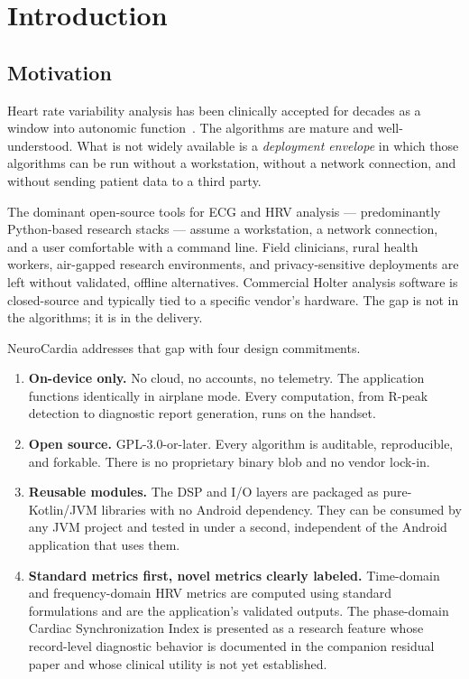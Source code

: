 \documentclass[11pt]{article}
\begin{document}
\tableofcontents

\section{Introduction}

\subsection{Motivation}

Heart rate variability analysis has been clinically accepted for
decades as a window into autonomic function~\cite{taskforce1996}. The
algorithms are mature and well-understood. What is not widely available
is a \emph{deployment envelope} in which those algorithms can be run
without a workstation, without a network connection, and without
sending patient data to a third party.

The dominant open-source tools for ECG and HRV analysis ---
predominantly Python-based research stacks --- assume a workstation, a
network connection, and a user comfortable with a command line. Field
clinicians, rural health workers, air-gapped research environments, and
privacy-sensitive deployments are left without validated, offline
alternatives. Commercial Holter analysis software is closed-source and
typically tied to a specific vendor's hardware. The gap is not in the
algorithms; it is in the delivery.

NeuroCardia addresses that gap with four design commitments.

\begin{enumerate}
\item \textbf{On-device only.} No cloud, no accounts, no telemetry. The
application functions identically in airplane mode. Every computation,
from R-peak detection to diagnostic report generation, runs on the
handset.
\item \textbf{Open source.} GPL-3.0-or-later. Every algorithm is
auditable, reproducible, and forkable. There is no proprietary binary
blob and no vendor lock-in.
\item \textbf{Reusable modules.} The DSP and I/O layers are packaged as
pure-Kotlin/JVM libraries with no Android dependency. They can be
consumed by any JVM project and tested in under a second, independent
of the Android application that uses them.
\item \textbf{Standard metrics first, novel metrics clearly labeled.}
Time-domain and frequency-domain HRV metrics are computed using
standard formulations and are the application's validated outputs. The
phase-domain Cardiac Synchronization Index is presented as a research
feature whose record-level diagnostic behavior is documented in the
companion residual paper and whose clinical utility is not yet
established.
\end{enumerate}
\end{document}
